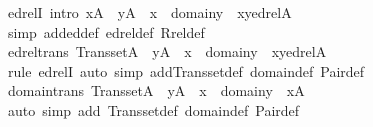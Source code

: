 \begin{isabellebody}
\isamarkupfalse%
\ edrelI\ {\isacharbrackleft}{\kern0pt}intro{\isacharbang}{\kern0pt}{\isacharbrackright}{\kern0pt}{\isacharcolon}{\kern0pt}\ {\isachardoublequoteopen}x{\isasymin}A\ {\isasymLongrightarrow}\ y{\isasymin}A\ {\isasymLongrightarrow}\ x\ {\isasymin}\ domain{\isacharparenleft}{\kern0pt}y{\isacharparenright}{\kern0pt}\ {\isasymLongrightarrow}\ {\isasymlangle}x{\isacharcomma}{\kern0pt}y{\isasymrangle}{\isasymin}edrel{\isacharparenleft}{\kern0pt}A{\isacharparenright}{\kern0pt}{\isachardoublequoteclose}\isanewline
%
\isadelimproof
\ \ %
\endisadelimproof
%
\isatagproof
{}\isamarkupfalse%
\ {\isacharparenleft}{\kern0pt}simp\ add{\isacharcolon}{\kern0pt}ed{\isacharunderscore}{\kern0pt}def\ edrel{\isacharunderscore}{\kern0pt}def\ Rrel{\isacharunderscore}{\kern0pt}def{\isacharparenright}{\kern0pt}%
\endisatagproof
{\isafoldproof}%
%
\isadelimproof
\isanewline
%
\endisadelimproof
\isanewline
{}\isamarkupfalse%
\ edrel{\isacharunderscore}{\kern0pt}trans{\isacharcolon}{\kern0pt}\ {\isachardoublequoteopen}Transset{\isacharparenleft}{\kern0pt}A{\isacharparenright}{\kern0pt}\ {\isasymLongrightarrow}\ y{\isasymin}A\ {\isasymLongrightarrow}\ x\ {\isasymin}\ domain{\isacharparenleft}{\kern0pt}y{\isacharparenright}{\kern0pt}\ {\isasymLongrightarrow}\ {\isasymlangle}x{\isacharcomma}{\kern0pt}y{\isasymrangle}{\isasymin}edrel{\isacharparenleft}{\kern0pt}A{\isacharparenright}{\kern0pt}{\isachardoublequoteclose}\isanewline
%
\isadelimproof
\ \ %
\endisadelimproof
%
\isatagproof
{}\isamarkupfalse%
\ {\isacharparenleft}{\kern0pt}rule\ edrelI{\isacharcomma}{\kern0pt}\ auto\ simp\ add{\isacharcolon}{\kern0pt}Transset{\isacharunderscore}{\kern0pt}def\ domain{\isacharunderscore}{\kern0pt}def\ Pair{\isacharunderscore}{\kern0pt}def{\isacharparenright}{\kern0pt}%
\endisatagproof
{\isafoldproof}%
%
\isadelimproof
\isanewline
%
\endisadelimproof
\isanewline
{}\isamarkupfalse%
\ domain{\isacharunderscore}{\kern0pt}trans{\isacharcolon}{\kern0pt}\ {\isachardoublequoteopen}Transset{\isacharparenleft}{\kern0pt}A{\isacharparenright}{\kern0pt}\ {\isasymLongrightarrow}\ y{\isasymin}A\ {\isasymLongrightarrow}\ x\ {\isasymin}\ domain{\isacharparenleft}{\kern0pt}y{\isacharparenright}{\kern0pt}\ {\isasymLongrightarrow}\ x{\isasymin}A{\isachardoublequoteclose}\isanewline
%
\isadelimproof
\ \ %
\endisadelimproof
%
\isatagproof
{}\isamarkupfalse%
\ {\isacharparenleft}{\kern0pt}auto\ simp\ add{\isacharcolon}{\kern0pt}\ Transset{\isacharunderscore}{\kern0pt}def\ domain{\isacharunderscore}{\kern0pt}def\ Pair{\isacharunderscore}{\kern0pt}def{\isacharparenright}{\kern0pt}%

\end{isabellebody}
